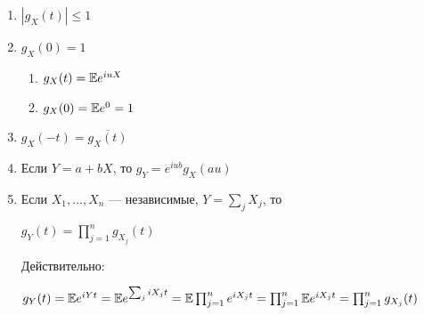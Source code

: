 \begin{enumerate}
\def\labelenumi{\arabic{enumi}.}
\item
  \(|g_X (t)| \leq 1\)
\item
  \(g_X(0) = 1\)

  \begin{enumerate}
  \def\labelenumii{\arabic{enumii}.}
  
  \item
    \(g_X(t) = \mathbb E e^{iu X}\)
  \item
    \(g_X(0) = \mathbb E e^0 = 1\)
  \end{enumerate}
\item
  \(g_X(-t) = \overline{g_X(t)}\)
\item
  Если \(Y = a+bX\), то \(g_Y = e^{iub} g_X(au)\)
\item
  Если \(X_1, \ldots, X_n\) --- независимые, \(Y = \sum_j X_j\), то

  \(g_Y(t) = \prod\limits_{j=1}^n g_{X_j}(t)\)

  Действительно:

  \(g_Y(t) = \mathbb E e^{iYt} = \mathbb E e^{\sum_j i X_j t} = \mathbb E \prod_{j=1}^n e^{i X_j t} = \prod_{j=1}^n \mathbb E e^{i X_j t} = \prod_{j=1}^n g_{X_j}(t)\)
\end{enumerate}
